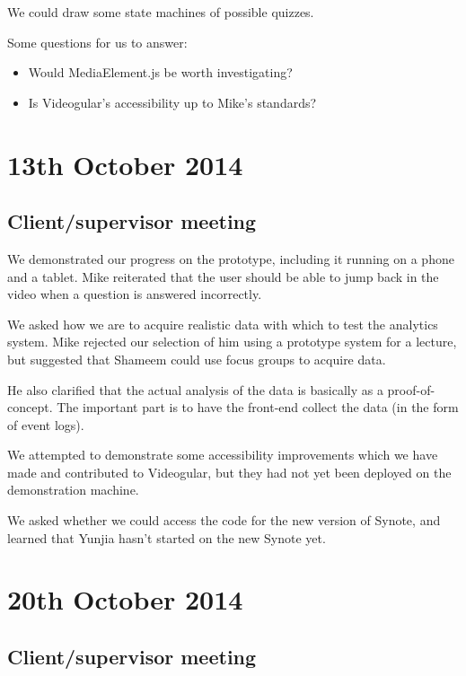 We could draw some state machines of possible quizzes.

Some questions for us to answer:

\begin{itemize}
\itemsep1pt\parskip0pt
\item
  Would MediaElement.js be worth investigating?
\item
  Is Videogular's accessibility up to Mike's standards?
\end{itemize}

\section{13th October 2014}\label{Minutes:2014-10-13}

\subsection{Client/supervisor meeting}

We demonstrated our progress on the prototype, including it running on a
phone and a tablet. Mike reiterated that the user should be able to jump
back in the video when a question is answered incorrectly.

We asked how we are to acquire realistic data with which to test the
analytics system. Mike rejected our selection of him using a prototype
system for a lecture, but suggested that Shameem could use focus groups
to acquire data.

He also clarified that the actual analysis of the data is basically as a
proof-of-concept. The important part is to have the front-end collect
the data (in the form of event logs).

We attempted to demonstrate some accessibility improvements which we
have made and contributed to Videogular, but they had not yet been
deployed on the demonstration machine.

We asked whether we could access the code for the new version of Synote,
and learned that Yunjia hasn't started on the new Synote yet.

\section{20th October 2014}\label{Minutes:2014-10-20}

\subsection{Client/supervisor meeting}

